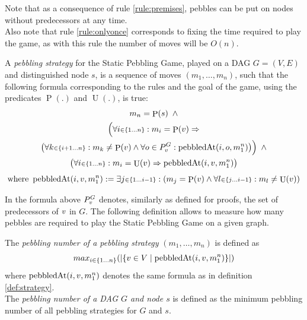 \documentclass{llncs}
\DeclareMathOperator{\pebble}{P}
\DeclareMathOperator{\unpebble}{U}
\DeclareMathOperator{\pebbledAt}{pebbledAt}
\newcommand{\indexIn}[3]{\ensuremath{#1 \scriptstyle \in \{#2\ldots #3\} \displaystyle}}
\newcommand{\Premises}[2]{P_{#1}^{#2}}
\begin{document}
Note that as a consequence of rule \ref{rule:premises}, pebbles can be put on nodes without predecessors at any time.\\
Also note that rule \ref{rule:onlyonce} corresponds to fixing the time required to play the game, as with this rule the number of moves will be $O(n)$.

\begin{definition}[Strategy]
\label{def:strategy}
A \emph{pebbling strategy} for the Static Pebbling Game, played on a DAG $G = (V,E)$ and distinguished node $s$, is a sequence of moves $(m_1,\ldots,m_n)$, such that the following formula corresponding to the rules and the goal of the game, using the predicates $\pebble(.)$ and $\unpebble(.)$, is true:
\begin{gather*}
	m_n = \pebble(s) \enskip \wedge \\
	\Big( \forall \indexIn{i}{1}{n}: m_i = \pebble(\n) \Rightarrow \\
																\big( \forall \indexIn{k}{i+1}{n}: m_k \neq \pebble(\n) \wedge \forall o \in \Premises{\n}{G}: \pebbledAt(i,o,m^n_1) \big) \Big) \enskip \wedge\\
	\big( \forall \indexIn{i}{1}{n}: m_i = \unpebble(\n) \Rightarrow \pebbledAt(i,\n,m^n_1) \big)\\[1ex]
	\text{where } \pebbledAt(i,\n,m^n_1) := \exists \indexIn{j}{1}{i-1}: \left( m_j = \pebble(\n) \wedge \forall \indexIn{l}{j}{i-1}: m_l \neq \unpebble(\n) \right)
\end{gather*}
\end{definition}

In the formula above $\Premises{\n}{G}$ denotes, similarly as defined for proofs, the set of predecessors of $v$ in $G$.
The following definition allows to measure how many pebbles are required to play the Static Pebbling Game on a given graph.

\begin{definition}
The \emph{pebbling number of a pebbling strategy} $(m_1,\ldots,m_n)$ is defined as 
$$
	max_{\indexIn{i}{1}{n}}(|\{\n \in V \mid \pebbledAt(i,\n,m^n_1)\}|)
$$
where $\pebbledAt(i,\n,m^n_1)$ denotes the same formula as in definition \ref{def:strategy}.\\
The \emph{pebbling number of a DAG $G$ and node $s$} is defined as the minimum pebbling number of all pebbling strategies for $G$ and $s$.
\end{definition}
\end{document}
